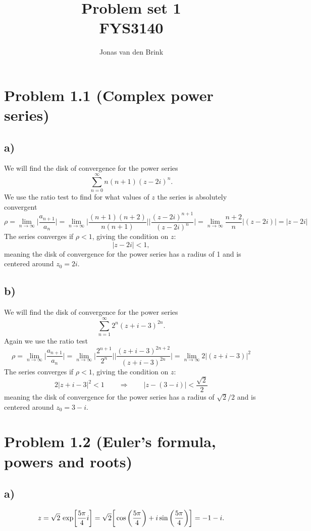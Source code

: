 \documentclass[a4paper, 11pt, titlepage, english]{article}
\author{Jonas van den Brink}
\title{Problem set 1 \\ FYS3140}
\begin{document}
\maketitle
\newpage\null\thispagestyle{empty}\newpage

\setcounter{page}{1} 

\section*{Problem 1.1 (Complex power series)}
\subsection*{a)}
We will find the disk of convergence for the power series
$$\sum_{n=0}^\infty n(n+1)(z-2i)^n.$$
We use the ratio test to find for what values of $z$ the series is absolutely convergent
$$\rho = \lim_{n\rightarrow \infty} \bigg|\frac{a_{n+1}}{a_n} \bigg| = \lim_{n\rightarrow \infty} \bigg|\frac{(n+1)(n+2)}{n(n+1)}\bigg|\bigg|\frac{(z-2i)^{n+1}}{(z-2i)^n}\bigg| = \lim_{n\rightarrow \infty} \frac{n+2}{n} |(z-2i)| = |z-2i|$$
The series converges if $\rho<1$, giving the condition on $z$:
$$|z-2i| < 1,$$
meaning the disk of convergence for the power series has a radius of 1 and is centered around $z_0 = 2i$.

\subsection*{b)}
We will find the disk of convergence for the power series
$$\sum_{n=1}^\infty 2^n(z+i-3)^{2n}.$$
Again we use the ratio test
$$\rho = \lim_{n\rightarrow \infty} \bigg|\frac{a_{n+1}}{a_n} \bigg| = \lim_{n\rightarrow \infty} \bigg| \frac{2^{n+1}}{2^n}\bigg|\bigg|\frac{(z+i-3)^{2n+2}}{(z+i-3)^{2n}} \bigg| = \lim_{n\rightarrow \infty} 2|(z+i-3)|^2$$
The series converges if $\rho<1$, giving the condition on $z$:
$$2|z+i-3|^2 < 1 \qquad \Rightarrow \qquad |z-(3-i)| < \frac{\sqrt{2}}{2}$$
meaning the disk of convergence for the power series has a radius of $\sqrt{2}/2$ and is centered around $z_0 = 3-i$.

\clearpage

\section*{Problem 1.2 (Euler's formula, powers and roots)}
\subsection*{a)}
\begin{align*}
z = \sqrt{2}\ {\rm exp}\bigg[\frac{5\pi}{4}i\bigg] = \sqrt{2}\bigg[\cos\bigg(\frac{5\pi}{4}\bigg) + i\sin\bigg(\frac{5\pi}{4}\bigg)\bigg] = -1 - i.    
\end{align*}
\end{document}
